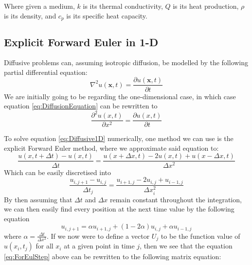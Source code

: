 \documentclass[a4paper,10pt,english]{article}
\renewcommand{\vec}[1]{\mathbf{#1}}
\begin{document}
Where given a medium, $k$ is its thermal conductivity, $Q$ is its heat production, $\rho$ is its density, and $c_p$ is its specific heat capacity. 

\subsection*{Explicit Forward Euler in 1-D}


Diffusive problems can, assuming isotropic diffusion, be modelled by the following partial differential equation:
\begin{equation}
\nabla^{2} u(\vec{x}, t) = \dfrac{\partial u(\vec{x}, t)}{\partial t}
\label{eq:DiffusionEquation}
\end{equation}
We are initially going to be regarding the one-dimensional case, in which case equation \ref{eq:DiffusionEquation} can be rewritten to 
\begin{equation}
\dfrac{\partial^2 u(x,t)}{\partial x^2} = \dfrac{\partial u(x,t)}{\partial t}
\label{eq:Diffusive1D}
\end{equation}


To solve equation \ref{eq:Diffusive1D} numerically, one method we can use is the explicit Forward Euler method, where we approximate said equation to:
\begin{equation}
\dfrac{u(x, t + \Delta t) - u(x,t)}{\Delta t} = \dfrac{u(x + \Delta x, t) - 2u(x,t) + u(x - \Delta x, t)}{\Delta x^2}
\label{eq:ForEul1}
\end{equation}
Which can be easily discretised into 
\begin{equation}
\dfrac{u_{i,j+1} - u_{i,j}}{\Delta t_j} = \dfrac{u_{i+1,j} - 2u_{i,j} + u_{i-1,j}}{\Delta x_i^2}
\label{eq:ForEul2}
\end{equation}
By then assuming that $\Delta t$ and $\Delta x$ remain constant throughout the integration, we can then easily find every position at the next time value by the following equation
\begin{equation}
u_{i,j+1} = \alpha u_{i+1,j} + (1-2\alpha) u_{i,j} + \alpha u_{i-1,j} 
\label{eq:ForEulStep}
\end{equation}
where $\alpha = \tfrac{\Delta t}{\Delta x^2}$. If we now were to define a vector $U_j$ to be the function value of $u(x_i, t_j)$ for all $x_i$ at a given point in time $j$, then we see that the equation \ref{eq:ForEulStep} above can be rewritten to the following matrix equation:
\end{document}
